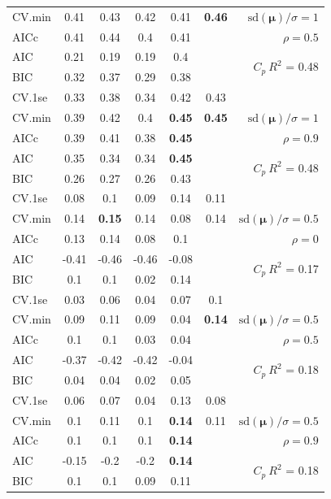 \documentclass[12pt]{article}
\newcommand{\mr}[1]{\mathrm{#1}}
\newcommand{\bm}[1]{\mathbf{#1}}
\begin{document}
\begin{table}[p]
\begin{center}
\begin{tabular}{l*{5}{c}|r}
CV.min & 0.41 & 0.43 & 0.42 & 0.41 & {\bf 0.46} &  $\mr{sd}(\bm{\mu})/\sigma=1$ \\
AICc & 0.41 & 0.44 & 0.4 & 0.41 & & $\rho=0.5$ \\
AIC & 0.21 & 0.19 & 0.19 & 0.4 & & \multirow{2}{*}{$C_p ~ R^2$ = 0.48} \\
BIC & 0.32 & 0.37 & 0.29 & 0.38 & & \\
 \hline 
CV.1se & 0.33 & 0.38 & 0.34 & 0.42 & 0.43 &\\
CV.min & 0.39 & 0.42 & 0.4 & {\bf 0.45} & {\bf 0.45} &  $\mr{sd}(\bm{\mu})/\sigma=1$ \\
AICc & 0.39 & 0.41 & 0.38 & {\bf 0.45} & & $\rho=0.9$ \\
AIC & 0.35 & 0.34 & 0.34 & {\bf 0.45} & & \multirow{2}{*}{$C_p ~ R^2$ = 0.48} \\
BIC & 0.26 & 0.27 & 0.26 & 0.43 & & \\
 \hline 
CV.1se & 0.08 & 0.1 & 0.09 & 0.14 & 0.11 &\\
CV.min & 0.14 & {\bf 0.15} & 0.14 & 0.08 & 0.14 &  $\mr{sd}(\bm{\mu})/\sigma=0.5$ \\
AICc & 0.13 & 0.14 & 0.08 & 0.1 & & $\rho=0$ \\
AIC & -0.41 & -0.46 & -0.46 & -0.08 & & \multirow{2}{*}{$C_p ~ R^2$ = 0.17} \\
BIC & 0.1 & 0.1 & 0.02 & 0.14 & & \\
 \hline 
CV.1se & 0.03 & 0.06 & 0.04 & 0.07 & 0.1 &\\
CV.min & 0.09 & 0.11 & 0.09 & 0.04 & {\bf 0.14} &  $\mr{sd}(\bm{\mu})/\sigma=0.5$ \\
AICc & 0.1 & 0.1 & 0.03 & 0.04 & & $\rho=0.5$ \\
AIC & -0.37 & -0.42 & -0.42 & -0.04 & & \multirow{2}{*}{$C_p ~ R^2$ = 0.18} \\
BIC & 0.04 & 0.04 & 0.02 & 0.05 & & \\
 \hline 
CV.1se & 0.06 & 0.07 & 0.04 & 0.13 & 0.08 &\\
CV.min & 0.1 & 0.11 & 0.1 & {\bf 0.14} & 0.11 &  $\mr{sd}(\bm{\mu})/\sigma=0.5$ \\
AICc & 0.1 & 0.1 & 0.1 & {\bf 0.14} & & $\rho=0.9$ \\
AIC & -0.15 & -0.2 & -0.2 & {\bf 0.14} & & \multirow{2}{*}{$C_p ~ R^2$ = 0.18} \\
BIC & 0.1 & 0.1 & 0.09 & 0.11 & & \\
 \hline 
\end{tabular}
\end{center}
\vspace{-1cm}
\end{table}
\end{document}
